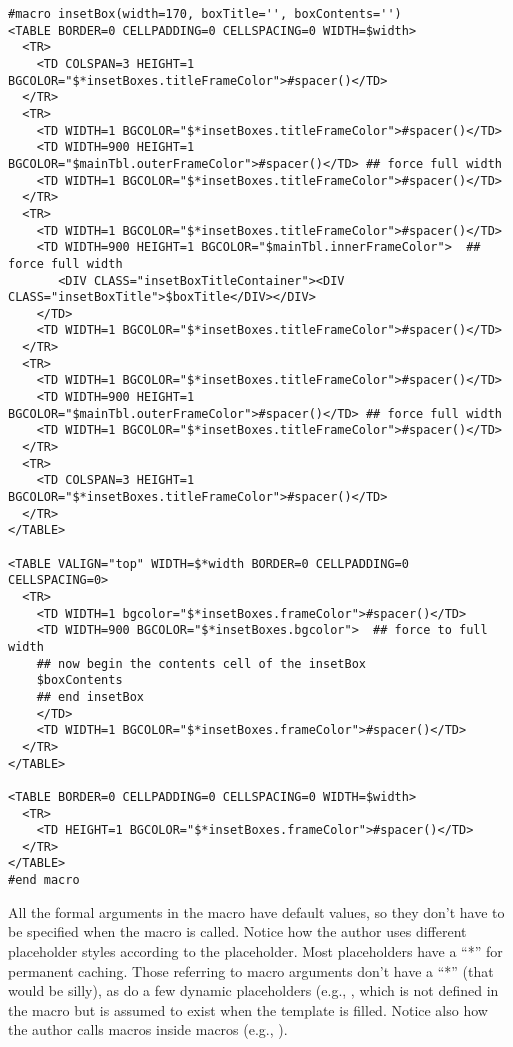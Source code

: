 \begin{verbatim}
#macro insetBox(width=170, boxTitle='', boxContents='')
<TABLE BORDER=0 CELLPADDING=0 CELLSPACING=0 WIDTH=$width>
  <TR>
    <TD COLSPAN=3 HEIGHT=1 BGCOLOR="$*insetBoxes.titleFrameColor">#spacer()</TD>
  </TR>
  <TR>
    <TD WIDTH=1 BGCOLOR="$*insetBoxes.titleFrameColor">#spacer()</TD>
    <TD WIDTH=900 HEIGHT=1 BGCOLOR="$mainTbl.outerFrameColor">#spacer()</TD> ## force full width 
    <TD WIDTH=1 BGCOLOR="$*insetBoxes.titleFrameColor">#spacer()</TD>
  </TR>
  <TR>
    <TD WIDTH=1 BGCOLOR="$*insetBoxes.titleFrameColor">#spacer()</TD>
    <TD WIDTH=900 HEIGHT=1 BGCOLOR="$mainTbl.innerFrameColor">  ## force full width 
       <DIV CLASS="insetBoxTitleContainer"><DIV CLASS="insetBoxTitle">$boxTitle</DIV></DIV>
    </TD>
    <TD WIDTH=1 BGCOLOR="$*insetBoxes.titleFrameColor">#spacer()</TD>
  </TR>
  <TR>
    <TD WIDTH=1 BGCOLOR="$*insetBoxes.titleFrameColor">#spacer()</TD>
    <TD WIDTH=900 HEIGHT=1 BGCOLOR="$mainTbl.outerFrameColor">#spacer()</TD> ## force full width 
    <TD WIDTH=1 BGCOLOR="$*insetBoxes.titleFrameColor">#spacer()</TD>
  </TR>
  <TR>
    <TD COLSPAN=3 HEIGHT=1 BGCOLOR="$*insetBoxes.titleFrameColor">#spacer()</TD>
  </TR>
</TABLE>
            
<TABLE VALIGN="top" WIDTH=$*width BORDER=0 CELLPADDING=0 CELLSPACING=0>
  <TR>
    <TD WIDTH=1 bgcolor="$*insetBoxes.frameColor">#spacer()</TD>
    <TD WIDTH=900 BGCOLOR="$*insetBoxes.bgcolor">  ## force to full width 
    ## now begin the contents cell of the insetBox
    $boxContents
    ## end insetBox     
    </TD>
    <TD WIDTH=1 BGCOLOR="$*insetBoxes.frameColor">#spacer()</TD>
  </TR>
</TABLE>

<TABLE BORDER=0 CELLPADDING=0 CELLSPACING=0 WIDTH=$width>
  <TR>
    <TD HEIGHT=1 BGCOLOR="$*insetBoxes.frameColor">#spacer()</TD>
  </TR>
</TABLE>
#end macro
\end{verbatim}

All the formal arguments in the  macro have default values, so
they don't have to be specified when the macro is called.  Notice how the 
author uses different placeholder styles according to the placeholder.  Most
placeholders have a ``*'' for permanent caching.  Those referring to macro
arguments don't have a ``*'' (that would be silly), as do a few dynamic
placeholders (e.g., , which is not defined in
the macro but is assumed to exist when the template is filled.  Notice also
how the author calls macros inside macros (e.g., ).

